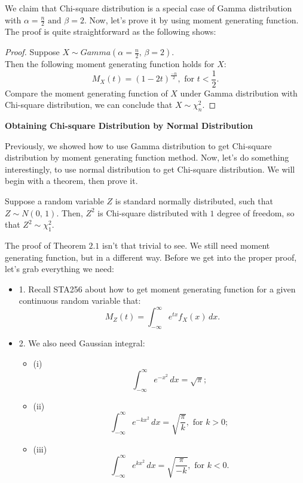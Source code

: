 \noindent
We claim that Chi-square distribution is a special case of Gamma distribution with $\alpha = \frac{n}{2} \text{ and } \beta = 2$. Now, let's prove it by using moment generating function.\\

\noindent
The proof is quite straightforward as the following shows:

\begin{proof} Suppose $X \sim Gamma( \alpha = \frac{n}{2} \text{, } \beta = 2).$ \\
Then the following moment generating function holds for $X$: \[ M_{X}(t) = (1- 2t)^{\frac{-n}{2}}, \text{ for $t < \frac{1}{2}$}.\]
Compare the moment generating function of $X$ under Gamma distribution with Chi-square distribution, we can conclude that $X \sim \chi_{n}^{2}$.
\end{proof}

\noindent
\textbf{Obtaining Chi-square Distribution by Normal Distribution}

\noindent
Previously, we showed how to use Gamma distribution to get Chi-square distribution by moment generating function method. Now, let's do something interestingly, to use normal distribution to get Chi-square distribution. We will begin with a theorem, then prove it.

\begin{theorem}
Suppose a random variable $Z$ is standard normally distributed, such that $Z \sim N(0 \text{, }1).$ Then, $Z^2$ is Chi-square distributed with $1$ degree of freedom, so that $Z^2 \sim \chi_{1}^{2}$.
\end{theorem}

\noindent
The proof of Theorem $2.1$ isn't that trivial to see. We still need moment generating function, but in a different way. Before we get into the proper proof, let's grab everything we need:

\begin{itemize}
	\item 1. Recall STA256 about how to get moment generating function for a given continuous random variable that: \[ M_{Z}(t) = \int_{-\infty}^{\infty} e^{tx}f_{X}(x)\,dx.\]
	\item 2. We also need Gaussian integral:
	\begin{itemize}
		\item (i) \[ \int_{-\infty}^{\infty} e^{-x^2}\,dx = \sqrt{\pi};\]
		\item (ii) \[ \int_{-\infty}^{\infty} e^{-kx^2}\,dx = \sqrt{\frac{\pi}{k}}, \text{ for $k > 0$};\]
		\item (iii) \[ \int_{-\infty}^{\infty} e^{kx^2}\,dx = \sqrt{\frac{\pi}{-k}}, \text{ for $k < 0$}.\]
	\end{itemize}
\end{itemize}

